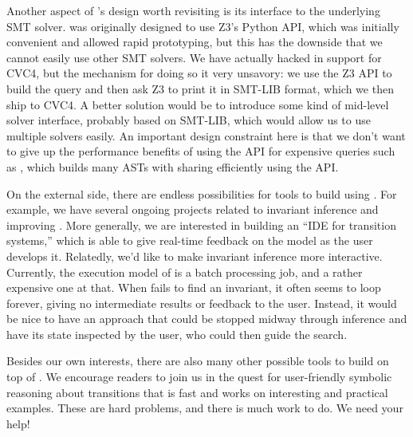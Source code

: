 Another aspect of \mypyvy's design worth revisiting is its interface to the underlying SMT solver.
\mypyvy was originally designed to use Z3's Python API,
  which was initially convenient and allowed rapid prototyping,
  but this has the downside that we cannot easily use other SMT solvers.
We have actually hacked in support for CVC4,
  but the mechanism for doing so it very unsavory:
  we use the Z3 API to build the query and then ask Z3 to print it in SMT-LIB format,
  which we then ship to CVC4.
A better solution would be to introduce some kind of mid-level solver interface,
  probably based on SMT-LIB,
  which would allow us to use multiple solvers easily.
An important design constraint here is that
  we don't want to give up the performance benefits
  of using the API for expensive queries such as \updr,
  which builds many ASTs with sharing efficiently using the API.


On the external side, there are endless possibilities for tools to build using \mypyvy.
For example, we have several ongoing projects related to invariant inference and improving \updr.
More generally, we are interested in building an ``IDE for transition systems,''
  which is able to give real-time feedback on the model as the user develops it.
Relatedly, we'd like to make invariant inference more interactive.
Currently, the execution model of \updr is a batch processing job,
  and a rather expensive one at that.
When \updr fails to find an invariant, it often seems to loop forever,
  giving no intermediate results or feedback to the user.
Instead, it would be nice to have an approach that
  could be stopped midway through inference
  and have its state inspected by the user,
  who could then guide the search.

Besides our own interests, there are also many other possible tools to build on top of \mypyvy.
We encourage readers to join us in the quest for user-friendly symbolic reasoning about transitions
  that is fast and works on interesting and practical examples.
These are hard problems, and there is much work to do. We need your help!
